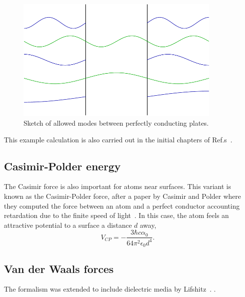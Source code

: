 \begin{figure}
\center
\includegraphics[width=10cm]{fig/intro/twoplanes_wave}
\caption{Sketch of allowed modes between perfectly conducting plates.}
\end{figure}


This example calculation is also carried out in the initial chapters of Ref.s~\cite{Milton2001,Bordag2009,Dalvit2011}.





\subsection{Casimir-Polder energy}

The Casimir force is also important for atoms near surfaces.  
This variant is known as the Casimir-Polder force, 
after a paper by Casimir and Polder where they computed the force between an 
atom and a perfect conductor accounting retardation due to the finite speed 
of light~\cite{CasimirPolder1948}.  
In this case, the atom feels an attractive potential to a surface a distance $d$ away,
\begin{equation}
V_{CP} =-\frac{3\hbar c\alpha_0}{64\pi^2\epsilon_0 d^4}.
\end{equation}


\subsection{Van der Waals forces}

The formalism was extended to include dielectric media by Lifshitz~\cite{Lifshitz1956}.
  .  

